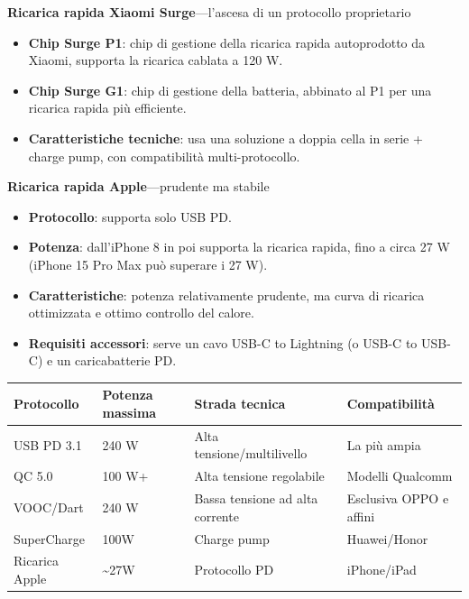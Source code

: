 \textbf{Ricarica rapida Xiaomi Surge}—l'ascesa di un protocollo proprietario

\begin{itemize}
  \item \textbf{Chip Surge P1}: chip di gestione della ricarica rapida autoprodotto da Xiaomi, supporta la ricarica cablata a 120 W.
  \item \textbf{Chip Surge G1}: chip di gestione della batteria, abbinato al P1 per una ricarica rapida più efficiente.
  \item \textbf{Caratteristiche tecniche}: usa una soluzione a doppia cella in serie + charge pump, con compatibilità multi-protocollo.
\end{itemize}

\textbf{Ricarica rapida Apple}—prudente ma stabile

\begin{itemize}
  \item \textbf{Protocollo}: supporta solo USB PD.
  \item \textbf{Potenza}: dall'iPhone 8 in poi supporta la ricarica rapida, fino a circa 27 W (iPhone 15 Pro Max può superare i 27 W).
  \item \textbf{Caratteristiche}: potenza relativamente prudente, ma curva di ricarica ottimizzata e ottimo controllo del calore.
  \item \textbf{Requisiti accessori}: serve un cavo USB-C to Lightning (o USB-C to USB-C) e un caricabatterie PD.
\end{itemize}


\begin{center}
\begin{tabularx}{\linewidth}{|X|X|X|X|}
\hline
\textbf{Protocollo} & \textbf{Potenza massima} & \textbf{Strada tecnica} & \textbf{Compatibilità} \tabularnewline
\hline
USB PD 3.1 & 240 W & Alta tensione/multilivello & La più ampia \tabularnewline
QC 5.0 & 100 W+ & Alta tensione regolabile & Modelli Qualcomm \tabularnewline
VOOC/Dart & 240 W & Bassa tensione ad alta corrente & Esclusiva OPPO e affini \tabularnewline
SuperCharge & 100W & Charge pump & Huawei/Honor \tabularnewline
Ricarica Apple & \textasciitilde{}27W & Protocollo PD & iPhone/iPad \tabularnewline
\hline
\end{tabularx}
\end{center}


